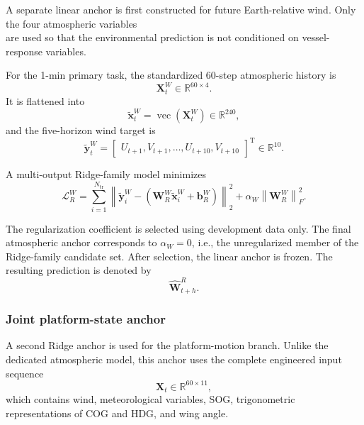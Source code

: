 A separate linear anchor is first constructed for future Earth-relative wind. Only the four atmospheric variables
\begin{equation}
[U,V,T,RH]
\end{equation}
are used so that the environmental prediction is not conditioned on vessel-response variables.

For the 1-min primary task, the standardized 60-step atmospheric history is
\begin{equation}
\mathbf X_t^{W}
\in
\mathbb R^{60\times4}.
\end{equation}
It is flattened into
\begin{equation}
\tilde{\mathbf x}_t^{W}
=
\operatorname{vec}
\left(
\mathbf X_t^{W}
\right)
\in
\mathbb R^{240},
\label{eq:wind_flat_input}
\end{equation}
and the five-horizon wind target is
\begin{equation}
\tilde{\mathbf y}_t^{W}
=
\begin{bmatrix}
U_{t+1},
V_{t+1},
\ldots,
U_{t+10},
V_{t+10}
\end{bmatrix}^{\mathrm T}
\in
\mathbb R^{10}.
\label{eq:wind_flat_target}
\end{equation}

A multi-output Ridge-family model \cite{Hoerl1970} minimizes
\begin{equation}
\mathcal L_R^W
=
\sum_{i=1}^{N_{\mathrm{tr}}}
\left\|
\tilde{\mathbf y}_i^W
-
\left(
\mathbf W_R^W
\tilde{\mathbf x}_i^W
+
\mathbf b_R^W
\right)
\right\|_2^2
+
\alpha_W
\left\|
\mathbf W_R^W
\right\|_F^2.
\label{eq:wind_ridge_loss}
\end{equation}

The regularization coefficient is selected using development data only. The final atmospheric anchor corresponds to $\alpha_W=0$, i.e., the unregularized member of the Ridge-family candidate set. After selection, the linear anchor is frozen. The resulting prediction is denoted by
\begin{equation}
\hat{\mathbf W}^{R}_{t+h}.
\label{eq:wind_ridge_pred}
\end{equation}

\subsubsection{Joint platform-state anchor}
\label{subsubsec:motion_anchor}

A second Ridge anchor is used for the platform-motion branch. Unlike the dedicated atmospheric model, this anchor uses the complete engineered input sequence
\begin{equation}
\mathbf X_t
\in
\mathbb R^{60\times11},
\end{equation}
which contains wind, meteorological variables, SOG, trigonometric representations of COG and HDG, and wing angle.

